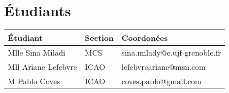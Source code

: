 \section{Étudiants}

\begin{tabular}{| l | l | l |}
    \hline
    Étudiant & Section & Coordonées\\
    \hline
    \hline
    Mlle Sina Miladi & MCS & sina.milady@e.ujf-grenoble.fr\\
    \hline
    Mll Ariane Lefebvre & ICAO & lefebvreariane@msn.com\\
    \hline
    M Pablo Coves & ICAO & coves.pablo@gmail.com\\
    \hline
\end{tabular}
